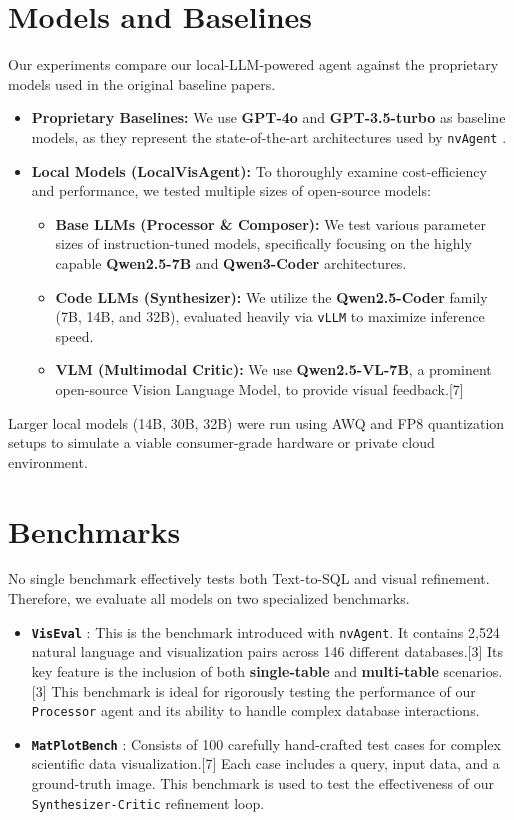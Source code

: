 \documentclass[a4paper,oneside,bibliography=totoc]{scrbook}
\begin{document}
\section{Models and Baselines}
\label{sec:models_baselines}
Our experiments compare our local-LLM-powered agent against the proprietary models used in the original baseline papers.

\begin{itemize}
 \item \textbf{Proprietary Baselines:} We use \textbf{GPT-4o} and \textbf{GPT-3.5-turbo} as baseline models, as they represent the state-of-the-art architectures used by \texttt{nvAgent} \cite{[3]}.
 \item \textbf{Local Models (LocalVisAgent):} To thoroughly examine cost-efficiency and performance, we tested multiple sizes of open-source models:
 \begin{itemize}
 \item \textbf{Base LLMs (Processor \& Composer):} We test various parameter sizes of instruction-tuned models, specifically focusing on the highly capable \textbf{Qwen2.5-7B} and \textbf{Qwen3-Coder} architectures.
 \item \textbf{Code LLMs (Synthesizer):} We utilize the \textbf{Qwen2.5-Coder} family (7B, 14B, and 32B), evaluated heavily via \texttt{vLLM} to maximize inference speed.
 \item \textbf{VLM (Multimodal Critic):} We use \textbf{Qwen2.5-VL-7B}, a prominent open-source Vision Language Model, to provide visual feedback.[7]
 \end{itemize}
\end{itemize}
Larger local models (14B, 30B, 32B) were run using AWQ and FP8 quantization setups to simulate a viable consumer-grade hardware or private cloud environment.

\section{Benchmarks}
\label{sec:benchmarks}
No single benchmark effectively tests both Text-to-SQL and visual refinement. Therefore, we evaluate all models on two specialized benchmarks.

\begin{itemize}
 \item \textbf{\texttt{VisEval}} \cite{ouyang2025nvagent}: This is the benchmark introduced with \texttt{nvAgent}. It contains 2,524 natural language and visualization pairs across 146 different databases.[3] Its key feature is the inclusion of both \textbf{single-table} and \textbf{multi-table} scenarios.[3] This benchmark is ideal for rigorously testing the performance of our \texttt{Processor} agent and its ability to handle complex database interactions.
 \item \textbf{\texttt{MatPlotBench}} \cite{yang2024matplotagent}: Consists of 100 carefully hand-crafted test cases for complex scientific data visualization.[7] Each case includes a query, input data, and a ground-truth image. This benchmark is used to test the effectiveness of our \texttt{Synthesizer-Critic} refinement loop.
\end{itemize}
\end{document}
